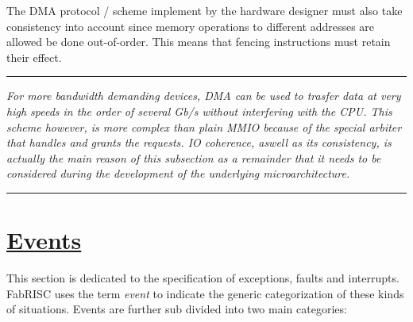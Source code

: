 \documentclass{article}
\begin{document}
            The DMA protocol / scheme implement by the hardware designer must also take consistency into account since memory operations to different addresses are allowed be done out-of-order. This means that fencing instructions must retain their effect.

        \par\noindent\rule{\textwidth}{0.4pt}
        \textit{For more bandwidth demanding devices, DMA can be used to trasfer data at very high speeds in the order of several Gb/s without interfering with the CPU. This scheme however, is more complex than plain MMIO because of the special arbiter that handles and grants the requests. IO coherence, aswell as its consistency, is actually the main reason of this subsection as a remainder that it needs to be considered during the development of the underlying microarchitecture.}
        \par\noindent\rule{\textwidth}{0.4pt}

    \clearpage


    \section[Events]{\LARGE\underline{Events}}

        This section is dedicated to the specification of exceptions, faults and interrupts. FabRISC uses the term \textit{event} to indicate the generic categorization of these kinds of situations. Events are further sub divided into two main categories:
\end{document}
